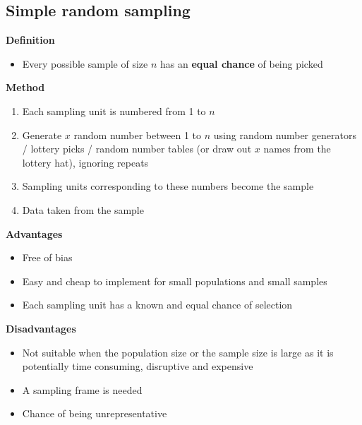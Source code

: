 \documentclass[oneside,fleqn,11pt]{book}
\begin{document}
	\subsection{Simple random sampling}
	\textbf{Definition}
	\begin{itemize}
		\item Every possible sample of size $n$ has an \textbf{equal chance} of being picked
	\end{itemize}
	\textbf{Method}
	\begin{enumerate}
		\item Each sampling unit is numbered from 1 to $n$
		\item Generate $x$ random number between 1 to $n$ using random number generators / lottery picks / random number tables (or draw out $x$ names from the lottery hat), ignoring repeats
		\item Sampling units corresponding to these numbers become the sample
		\item Data taken from the sample
	\end{enumerate}
	\textbf{Advantages}
	\begin{itemize}
		\item Free of bias
		\item Easy and cheap to implement for small populations and small samples
		\item Each sampling unit has a known and equal chance of selection
	\end{itemize}
	\textbf{Disadvantages}
	\begin{itemize}
		\item Not suitable when the population size or the sample size is large as it is potentially time consuming, disruptive and expensive
		\item A sampling frame is needed
		\item Chance of being unrepresentative
	\end{itemize}
\end{document}
